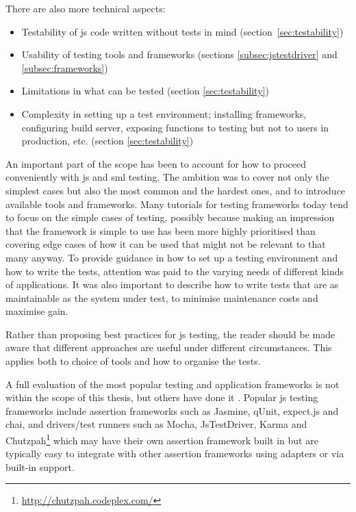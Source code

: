\documentclass[11pt]{article}
\begin{document}
There are also more technical aspects:
\begin{itemize}[label={--}]
\item Testability of \gls{js} code written without tests in mind (section~\ref{sec:testability})
\item Usability of testing tools and frameworks (sections \ref{subsec:jstestdriver} and \ref{subsec:frameworks})
\item Limitations in what can be tested (section \ref{sec:testability})
\item Complexity in setting up a test environment; installing frameworks, configuring build server, exposing functions to testing but not to users in production, etc. (section \ref{sec:testability})
\end{itemize}

An important part of the scope has been to account for how to proceed conveniently with \gls{js} and \gls{sml} testing. The ambition was to cover not only the simplest cases but also the most common and the hardest ones, and to introduce available tools and frameworks. Many tutorials for testing frameworks today tend to focus on the simple cases of testing, possibly because making an impression that the framework is simple to use has been more highly prioritised than covering edge cases of how it can be used that might not be relevant to that many anyway. To provide guidance in how to set up a testing environment and how to write the tests, attention was paid to the varying needs of different kinds of applications. It was also important to describe how to write tests that are as maintainable as the system under test, to minimise maintenance costs and maximise gain.

Rather than proposing best practices for \gls{js} testing, the reader should be made aware that different approaches are useful under different circumstances. This applies both to choice of tools and how to organise the tests.

A full evaluation of the most popular testing and application frameworks is not within the scope of this thesis, but others have done it \cite{JackFranklin}\cite{SebastianPorto}. Popular \gls{js} testing frameworks include assertion frameworks such as Jasmine, qUnit, expect.js and chai, and drivers/test runners such as Mocha, JsTestDriver, Karma and Chutzpah\footnote{\url{http://chutzpah.codeplex.com/}} which may have their own assertion framework built in but are typically easy to integrate with other assertion frameworks using adapters or via built-in support.
\end{document}
